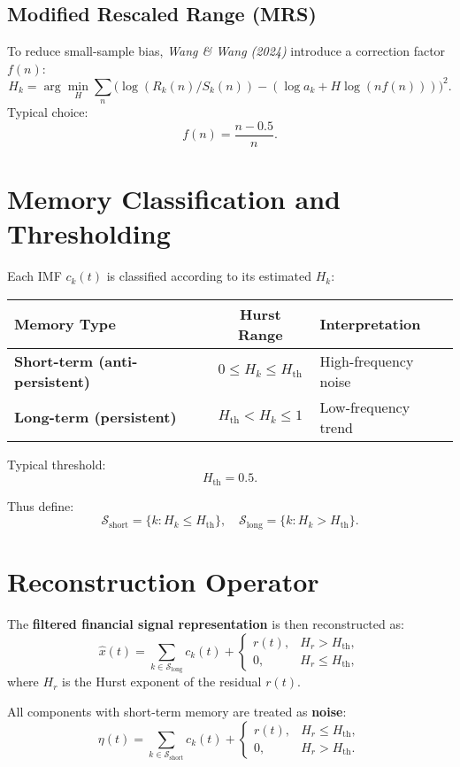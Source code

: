 \documentclass[11pt]{article}
\begin{document}
\subsection{Modified Rescaled Range (MRS)}
To reduce small-sample bias, \textit{Wang \& Wang (2024)} introduce a correction factor $f(n)$:
\[
H_k = \arg\min_{H} \sum_{n} \Big(\log(R_k(n)/S_k(n)) - (\log a_k + H \log(n f(n)))\Big)^2.
\]
Typical choice:
\[
f(n) = \frac{n-0.5}{n}.
\]



\section{Memory Classification and Thresholding}
Each IMF $c_k(t)$ is classified according to its estimated $H_k$:

\begin{table}[h]
\begin{center}
\begin{tabular}{|l|c|l|}
\hline
Memory Type & Hurst Range & Interpretation\\
\hline
\textbf{Short-term (anti-persistent)} & $0 \le H_k \le H_{\text{th}}$ & High-frequency noise \\
\hline
\textbf{Long-term (persistent)} & $H_{\text{th}} < H_k \le 1$ & Low-frequency trend \\
\hline
\end{tabular}
\end{center}
\end{table}

Typical threshold:
\[
H_{\text{th}} = 0.5.
\]

Thus define:
\[
\mathcal{S}_{\text{short}} = \{ k : H_k \le H_{\text{th}} \},
\quad
\mathcal{S}_{\text{long}}  = \{ k : H_k > H_{\text{th}} \}.
\]



\section{Reconstruction Operator}
The \textbf{filtered financial signal representation} is then reconstructed as:
\[
\hat{x}(t) = \sum_{k \in \mathcal{S}_{\text{long}}} c_k(t) + 
\begin{cases}
r(t), & H_r > H_{\text{th}},\\[4pt]
0, & H_r \le H_{\text{th}},
\end{cases}
\]
where $H_r$ is the Hurst exponent of the residual $r(t)$.

All components with short-term memory are treated as \textbf{noise}:
\[
\eta(t) = \sum_{k \in \mathcal{S}_{\text{short}}} c_k(t) + 
\begin{cases}
r(t), & H_r \le H_{\text{th}},\\[4pt]
0, & H_r > H_{\text{th}}.
\end{cases}
\]
\end{document}
